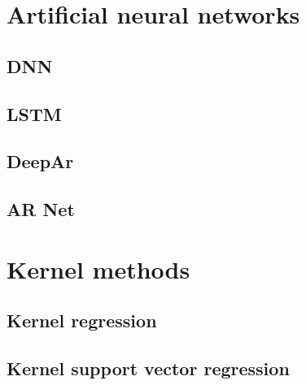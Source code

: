 \section{Artificial neural networks}
\subsection{DNN}
\subsection{LSTM}
\subsection{DeepAr}
\subsection{AR Net}

\section{Kernel methods}
\subsection{Kernel regression}
\subsection{Kernel support vector regression}